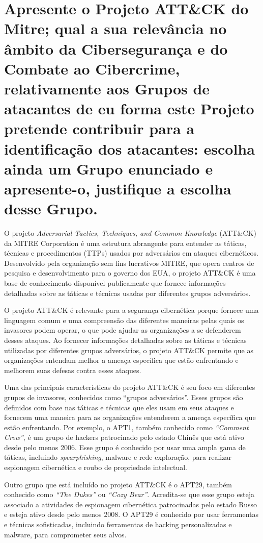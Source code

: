 \section[Pergunta 2]{Apresente o Projeto ATT\&CK do Mitre; qual a sua relevância no âmbito da Cibersegurança e do Combate ao Cibercrime, relativamente aos Grupos de atacantes de eu forma este Projeto pretende contribuir para a identificação dos atacantes: escolha ainda um Grupo enunciado e apresente-o, justifique a escolha desse Grupo.}

O projeto \textit{Adversarial Tactics, Techniques, and Common Knowledge} (ATT\&CK) da MITRE Corporation é uma estrutura abrangente para entender as táticas, técnicas e procedimentos (TTPs) usados por adversários em ataques cibernéticos. Desenvolvido pela organização sem fins lucrativos MITRE, que opera centros de pesquisa e desenvolvimento para o governo dos EUA, o projeto ATT\&CK é uma base de conhecimento disponível publicamente que fornece informações detalhadas sobre as táticas e técnicas usadas por diferentes grupos adversários.

O projeto ATT\&CK é relevante para a segurança cibernética porque fornece uma linguagem comum e uma compreensão das diferentes maneiras pelas quais os invasores podem operar, o que pode ajudar as organizações a se defenderem desses ataques. Ao fornecer informações detalhadas sobre as táticas e técnicas utilizadas por diferentes grupos adversários, o projeto ATT\&CK permite que as organizações entendam melhor a ameaça específica que estão enfrentando e melhorem suas defesas contra esses ataques.

Uma das principais características do projeto ATT\&CK é seu foco em diferentes grupos de invasores, conhecidos como ``grupos adversários''. Esses grupos são definidos com base nas táticas e técnicas que eles usam em seus ataques e fornecem uma maneira para as organizações entenderem a ameaça específica que estão enfrentando. Por exemplo, o APT1, também conhecido como \textit{``Comment Crew''}, é um grupo de hackers patrocinado pelo estado Chinês que está ativo desde pelo menos 2006. Esse grupo é conhecido por usar uma ampla gama de táticas, incluindo \textit{spearphishing}, malware e rede exploração, para realizar espionagem cibernética e roubo de propriedade intelectual.

Outro grupo que está incluído no projeto ATT\&CK é o APT29, também conhecido como \textit{``The Dukes''} ou \textit{``Cozy Bear''}. Acredita-se que esse grupo esteja associado a atividades de espionagem cibernética patrocinadas pelo estado Russo e esteja ativo desde pelo menos 2008. O APT29 é conhecido por usar ferramentas e técnicas sofisticadas, incluindo ferramentas de hacking personalizadas e malware, para comprometer seus alvos.

